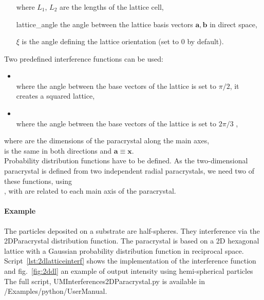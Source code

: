 \subsubsection{ } \label{paragraph2dpara}
\begin{itemize}
\item[where] $L_1$, $L_2$ are the lengths of the lattice cell,
\item[] lattice\_angle the angle between the lattice basis vectors $\mathbf{a}, \mathbf{b}$ in direct space,
\item[] $\xi$ is the angle defining the lattice orientation (set to $0$ by default).
\end{itemize}
Two predefined interference functions can be used:
\begin{itemize}
\item  {}\\
where the angle between the base vectors of the lattice is set to $\pi/2$,
it creates a squared lattice,
\item {}\\
where the angle between the base vectors of the lattice is set to $2\pi/3$ ,
\end{itemize}
where
 are the dimensions of the paracrystal along the main axes,\\  is the same in both directions and $\mathbf{a}\equiv \mathbf{x}$.\\

Probability distribution functions have to be defined. As the two-dimensional paracrystal is defined from two independent radial paracrystals, we need two of these functions, using\\ , with  are related to each main axis of the paracrystal.


\paragraph{Example} The particles deposited on a substrate are half-spheres. They interference via the 2DParacrystal distribution function. The paracrystal is based on a 2D hexagonal lattice with a Gaussian probability distribution function in reciprocal space.  Script~\ref{lst:2dlatticeinterf} shows the implementation of the interference function and fig.~\ref{fig:2ddl} an example of output intensity using hemi-spherical particles The full script, UMInterferences2DParacrystal.py is available in /Examples/python/UserManual.

